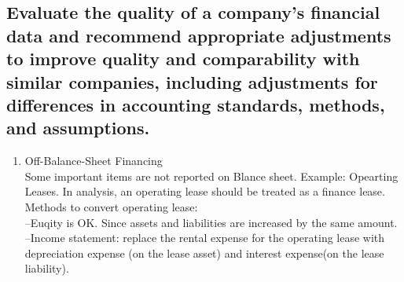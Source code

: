 \documentclass{article}
\newcommand{\be}{\begin{enumerate}}
\newcommand{\ee}{\end{enumerate}}
\begin{document}
\subsection{Evaluate the quality of a company's financial data and recommend appropriate
adjustments to improve quality and comparability with similar companies, including adjustments
for differences in accounting standards, methods, and assumptions.}
\be
    \item Off-Balance-Sheet Financing
        \\Some important items are not reported on Blance sheet. Example: Opearting Leases.
        In analysis, an operating lease should be treated as a finance lease.
        \\Methods to convert operating lease:
        \\--Euqity is OK. Since assets and liabilities are increased by the same amount.
        \\--Income statement: replace the rental expense for the operating lease with 
        depreciation expense (on the lease asset) and interest expense(on the lease liability).
\ee
\end{document}
